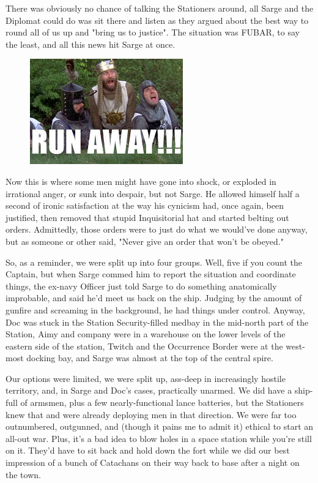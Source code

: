There was obviously no chance of talking the Stationers around, all Sarge and the Diplomat could do was sit there and listen as they argued about the best way to round all of us up and "bring us to justice". 
The situation was FUBAR, to say the least, and all this news hit Sarge at once.

\begin{figure}
	\begin{center}
		\includegraphics[width=\figwidth]{pics/14/24.png}
	\end{center}
\end{figure}
Now this is where some men might have gone into shock, or exploded in irrational anger, or sunk into despair, but not Sarge. 
He allowed himself half a second of ironic satisfaction at the way his cynicism had, once again, been justified, then removed that stupid Inquisitorial hat and started belting out orders. 
Admittedly, those orders were to just do what we would've done anyway, but as someone or other said, "Never give an order that won't be obeyed." 

So, as a reminder, we were split up into four groups. 
Well, five if you count the Captain, but when Sarge commed him to report the situation and coordinate things, the ex-navy Officer just told Sarge to do something anatomically improbable, and said he'd meet us back on the ship. 
Judging by the amount of gunfire and screaming in the background, he had things under control. 
Anyway, Doc was stuck in the Station Security-filled medbay in the mid-north part of the Station, Aimy and company were in a warehouse on the lower levels of the eastern side of the station, Twitch and the Occurrence Border were at the west-most docking bay, and Sarge was almost at the top of the central spire. 
 

Our options were limited, we were split up, ass-deep in increasingly hostile territory, and, in Sarge and Doc's cases, practically unarmed. 
We did have a ship-full of armsmen, plus a few nearly-functional lance batteries, but the Stationers knew that and were already deploying men in that direction. 
We were far too outnumbered, outgunned, and (though it pains me to admit it) ethical to start an all-out war. 
Plus, it's a bad idea to blow holes in a space station while you're still on it. 
They'd have to sit back and hold down the fort while we did our best impression of a bunch of Catachans on their way back to base after a night on the town.

